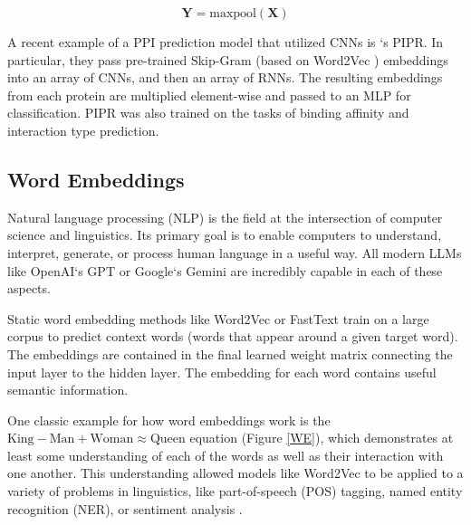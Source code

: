 \documentclass{article}
\begin{document}
\[\mathbf{Y} = \text{maxpool}(\mathbf{X})\]

A recent example of a PPI prediction model that utilized CNNs is \citet{chen_multifaceted_2019}`s PIPR. In particular, they pass pre-trained Skip-Gram (based on Word2Vec \cite{mikolov_word2vec_2013}) embeddings into an array of CNNs, and then an array of RNNs. The resulting embeddings from each protein are multiplied element-wise and passed to an MLP for classification. PIPR was also trained on the tasks of binding affinity and interaction type prediction.

\subsection{Word Embeddings}

Natural language processing (NLP) is the field at the intersection of computer science and linguistics. Its primary goal is to enable computers to understand, interpret, generate, or process human language in a useful way. All modern LLMs like OpenAI`s GPT \citep{brown_language_2020} or Google`s Gemini \citep{team2025gemini} are incredibly capable in each of these aspects. 

Static word embedding methods like Word2Vec \citep{mikolov_word2vec_2013} or FastText \citep{bojanowski_fasttext_2016} train on a large corpus to predict context words (words that appear around a given target word). The embeddings are contained in the final learned weight matrix connecting the input layer to the hidden layer. The embedding for each word contains useful semantic information. 

One classic example for how word embeddings work is the \(\text{King}-\text{Man}+\text{Woman}\approx \text{Queen}\) equation \citep{mikolov_word2vec_2013}(Figure \ref{WE}), which demonstrates at least some understanding of each of the words as well as their interaction with one another. This understanding allowed models like Word2Vec to be applied to a variety of problems in linguistics, like part-of-speech (POS) tagging, named entity recognition (NER), or sentiment analysis \citep{sivakumar_review_2020}.
\end{document}

